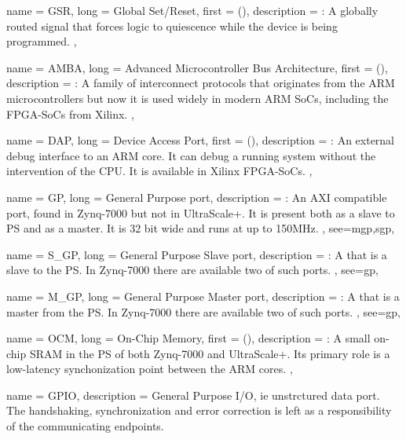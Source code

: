 {
	name = {GSR},
	long = {Global Set/Reset},
	first = { ()},
	description = {\emph{}:
		A globally routed signal that forces logic to 
		quiescence while the device is being programmed.
	},
}

{
	name = {AMBA},
	long = {Advanced Microcontroller Bus Architecture},
	first = { ()},
	description = {\emph{}:
		A family of interconnect protocols that originates 
		from the ARM microcontrollers but now it is used widely
		in modern ARM SoCs, including the FPGA-SoCs from Xilinx.
	},
}


{
	name = {DAP},
	long = {Device Access Port},
	first = { ()},
	description = {\emph{}:
		An external debug interface to an ARM core. It can debug a running system
		without the intervention of the CPU. It is available in Xilinx FPGA-SoCs.
	},
}

{
	name = {GP},
	long = {General Purpose port},
	description = {\emph{}:
		An AXI compatible port, found in Zynq-7000 but not in UltraScale+.
		It is present both as a slave to PS and as a master. 
		It is 32 bit wide and runs at up to 150MHz.
	},
	see={mgp,sgp},
}

{
	name = {S\_GP},
	long = {General Purpose Slave port},
	description = {\emph{}:
		A  that is a slave to the PS. 
		In Zynq-7000 there are available two of such ports.
	},
	see={gp},
}

{
	name = {M\_GP},
	long = {General Purpose Master port},
	description = {\emph{}:
		A  that is a master from the PS. 
		In Zynq-7000 there are available two of such ports.
	},
	see={gp},
}

{
	name = {OCM},
	long = {On-Chip Memory},
	first = { ()},
	description = {\emph{}:
		A small on-chip SRAM in the PS of both Zynq-7000 and UltraScale+.
		Its primary role is a low-latency synchonization point between the ARM cores.
	},
}

{
	name = {GPIO},
	description = {
		General Purpose I/O, ie unstrctured data port. 
		The handshaking, synchronization and error correction
		is left as a responsibility of the communicating endpoints.
	}
}

